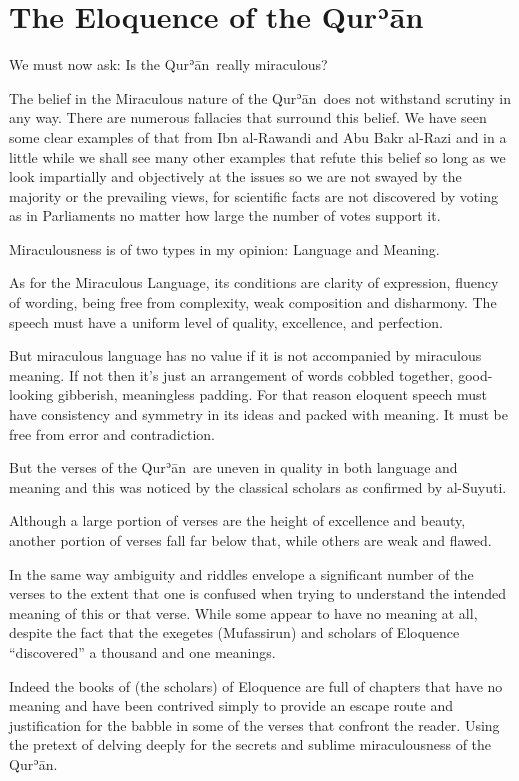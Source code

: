 \documentclass[12pt]{memoir}
\def\´{ʾ} %
\def \Quran{Qur\-\´ān} %
\def\–{-\hskip0pt}
\begin{document}
\section{The Eloquence of the \Quran}

We must now ask: Is the \Quran\ really miraculous?

The belief in the Miraculous nature of the \Quran\
does not withstand scrutiny in any way.
There are numerous fallacies that surround this belief.
We have seen some clear examples of that from Ibn al\–Rawandi and
Abu Bakr al\–Razi and in a little while we shall see many other examples
that refute this belief so long as we look impartially and objectively
at the issues so we are not swayed by the majority or the prevailing views,
for scientific facts are not discovered by voting as in Parliaments
no matter how large the number of votes support it.

Miraculousness is of two types in my opinion: Language and Meaning.

As for the Miraculous Language, its conditions are clarity of expression,
fluency of wording, being free from complexity,
weak composition and disharmony.
The speech must have a uniform level of quality, excellence, and perfection.

But miraculous language has no value
if it is not accompanied by miraculous meaning.
If not then it’s just an arrangement of words cobbled together,
good\–looking gibberish, meaningless padding.
For that reason eloquent speech must have consistency and symmetry
in its ideas and packed with meaning.
It must be free from error and contradiction.

But the verses of the \Quran\ are uneven in quality
in both language and meaning and this was noticed
by the classical scholars as confirmed by al\–Suyuti.

Although a large portion of verses are the height of excellence and beauty,
another portion of verses fall far below that,
while others are weak and flawed.

In the same way ambiguity and riddles envelope a significant number of
the verses to the extent that one is confused when trying to understand
the intended meaning of this or that verse.
While some appear to have no meaning at all,
despite the fact that the exegetes (Mufassirun) and
scholars of Eloquence “discovered” a thousand and one meanings.

Indeed the books of (the scholars) of Eloquence are full of chapters
that have no meaning and have been contrived simply to provide an escape
route and justification for the babble in some of the verses
that confront the reader.
Using the pretext of delving deeply for the secrets
and sublime miraculousness of the \Quran.
\end{document}
